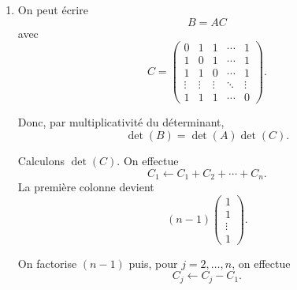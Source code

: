 \documentclass[12pt, a4paper]{article}
\begin{document}
\begin{enumerate}
    Puis, par l'observation, on a la base échelonnée réduite de l'espace des colonnes:
    \[
    \boxed{
    \left\{
    \left(\begin{array}{c}1\\0\\0\\0\\0\end{array}\right),
    \left(\begin{array}{c}0\\1\\0\\1\\0\end{array}\right),
    \left(\begin{array}{c}0\\0\\1\\0\\0\end{array}\right),
    \left(\begin{array}{c}0\\0\\0\\0\\1\end{array}\right)
    \right\}.
    }
    \]
    \pagebreak
  \item 
    On peut écrire
    \[
    B=AC
    \]
    avec
    \[
    C=
    \left(\begin{array}{ccccc}
    0&1&1&\cdots&1\\
    1&0&1&\cdots&1\\
    1&1&0&\cdots&1\\
    \vdots&\vdots&\vdots&\ddots&\vdots\\
    1&1&1&\cdots&0
    \end{array}\right).
    \]

    Donc, par multiplicativité du déterminant,
    \[
    \det(B)=\det(A)\det(C).
    \]

    Calculons $\det(C)$. On effectue
    \[
    C_1\leftarrow C_1+C_2+\cdots+C_n.
    \]
    La première colonne devient
    \[
    (n-1)
    \left(\begin{array}{c}
    1\\
    1\\
    \vdots\\
    1
    \end{array}\right).
    \]

    On factorise $(n-1)$ puis, pour $j=2,\ldots,n$, on effectue
    \[
    C_j\leftarrow C_j-C_1.
    \]


\end{enumerate}
\end{document}
